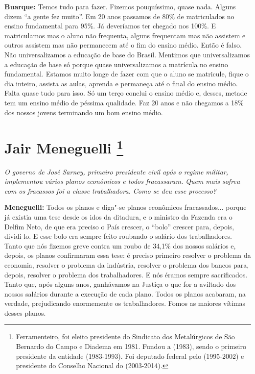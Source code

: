 \textbf{Buarque:} Temos tudo para fazer. Fizemos pouquíssimo, quase
nada. Alguns dizem ``a gente fez muito''. Em 20 anos passamos de 80\% de
matriculados no ensino fundamental para 95\%. Já deveríamos ter chegado
nos 100\%. E matriculamos mas o aluno não frequenta, alguns frequentam
mas não assistem e outros assistem mas não permanecem até o fim do
ensino médio. Então é falso. Não universalizamos a educação de base do
Brasil. Mentimos que universalizamos a educação de base só porque quase
universalizamos a matrícula no ensino fundamental. Estamos muito longe
de fazer com que o aluno se matricule, fique o dia inteiro, assista as
aulas, aprenda e permaneça até o final do ensino médio. Falta quase tudo
para isso. Só um terço conclui o ensino médio e, desses, metade tem um
ensino médio de péssima qualidade. Faz 20 anos e não chegamos a 18\% dos
nossos jovens terminando um bom ensino médio.

\chapter{Jair Meneguelli
\footnote{Ferramenteiro, foi eleito presidente do Sindicato dos Metalúrgicos de
São Bernardo do Campo e Diadema em 1981. Fundou a  (1983), sendo o
primeiro presidente da entidade (1983-1993). Foi deputado federal pelo
 (1995-2002) e presidente do Conselho Nacional do  (2003-2014).}}

\emph{O governo de José Sarney, primeiro presidente civil após o
regime militar, implementou vários planos econômicos e todos
fracassaram. Quem mais sofreu com os fracassos foi a classe
trabalhadora. Como se deu esse processo?}

\textbf{Meneguelli:} Todos os planos e diga"-se planos econômicos
fracassados... porque já existia uma tese desde os idos da ditadura, e o
ministro da Fazenda era o Delfim Neto, de que era preciso o País
crescer, o ``bolo'' crescer para, depois, dividi-lo. E esse bolo era
sempre feito roubando o salário dos trabalhadores. Tanto que nós fizemos
greve contra um roubo de 34,1\% dos nossos salários e, depois, os planos
confirmaram essa tese: é preciso primeiro resolver o problema da
economia, resolver o problema da indústria, resolver o problema dos
bancos para, depois, resolver o problema dos trabalhadores. E nós éramos
sempre sacrificados. Tanto que, após alguns anos, ganhávamos na Justiça
o que for a aviltado dos nossos salários durante a execução de cada
plano. Todos os planos acabaram, na verdade, prejudicando enormemente os
trabalhadores. Fomos as maiores vítimas desses planos.

